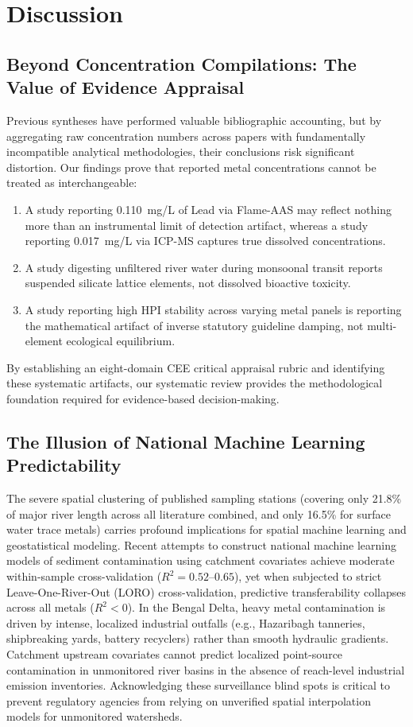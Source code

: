 \documentclass[authoryear,preprint,12pt]{elsarticle}
\begin{document}
\section{Discussion}

\subsection{Beyond Concentration Compilations: The Value of Evidence Appraisal}
Previous syntheses \citep[e.g.,][]{Pandit2025} have performed valuable bibliographic accounting, but by aggregating raw concentration numbers across papers with fundamentally incompatible analytical methodologies, their conclusions risk significant distortion. Our findings prove that reported metal concentrations cannot be treated as interchangeable:
\begin{enumerate}
    \item A study reporting 0.110~mg/L of Lead via Flame-AAS may reflect nothing more than an instrumental limit of detection artifact, whereas a study reporting 0.017~mg/L via ICP-MS captures true dissolved concentrations.
    \item A study digesting unfiltered river water during monsoonal transit reports suspended silicate lattice elements, not dissolved bioactive toxicity.
    \item A study reporting high HPI stability across varying metal panels is reporting the mathematical artifact of inverse statutory guideline damping, not multi-element ecological equilibrium.
\end{enumerate}
By establishing an eight-domain CEE critical appraisal rubric and identifying these systematic artifacts, our systematic review provides the methodological foundation required for evidence-based decision-making.

\subsection{The Illusion of National Machine Learning Predictability}
The severe spatial clustering of published sampling stations (covering only 21.8\% of major river length across all literature combined, and only 16.5\% for surface water trace metals) carries profound implications for spatial machine learning and geostatistical modeling. Recent attempts to construct national machine learning models of sediment contamination using catchment covariates achieve moderate within-sample cross-validation ($R^2 = 0.52\text{--}0.65$), yet when subjected to strict Leave-One-River-Out (LORO) cross-validation, predictive transferability collapses across all metals ($R^2 < 0$). In the Bengal Delta, heavy metal contamination is driven by intense, localized industrial outfalls (e.g., Hazaribagh tanneries, shipbreaking yards, battery recyclers) rather than smooth hydraulic gradients. Catchment upstream covariates cannot predict localized point-source contamination in unmonitored river basins in the absence of reach-level industrial emission inventories. Acknowledging these surveillance blind spots is critical to prevent regulatory agencies from relying on unverified spatial interpolation models for unmonitored watersheds.
\end{document}

